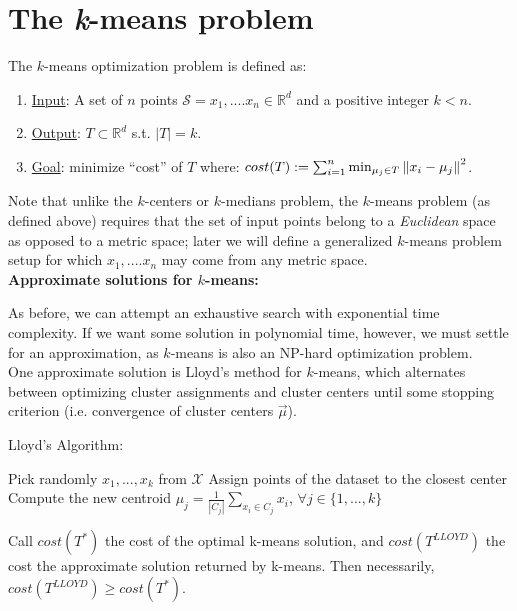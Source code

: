 \section{The \emph{k}-means problem}
The $k$-means optimization problem is defined as:
\begin{enumerate}
\item \underline{Input}: A set of $n$ points $\mathcal{S} = x_1,....x_n \in
\mathbb{R}^d$ and a positive integer $k<n$.
\item \underline{Output}: $T \subset  \mathbb{R}^d$ s.t. $|T|=k$. 
\item \underline{Goal}: minimize ``cost'' of $T$ where: $cost(T) 
:= \sum_{i = 1}^{n} \min_{\mu_j \in T} \left\lVert x_i-\mu_j\right\rVert^2 $.
\end{enumerate}

Note that unlike the $k$-centers or $k$-medians problem, the $k$-means problem (as defined above) requires that the set of input points belong to a \emph{Euclidean} space as opposed to a metric space; later we will define a generalized $k$-means problem setup for which $x_1,....x_n$ may come from any metric space. \\

\noindent\textbf{Approximate solutions for $k$-means:}  

As before, we can attempt an exhaustive search with exponential
time complexity. If we want some solution in polynomial time, however, we
must settle for an approximation, as $k$-means is also an NP-hard
optimization problem. \\

One approximate solution is Lloyd's method for $k$-means, which alternates between optimizing cluster assignments and cluster centers until some stopping criterion (i.e. convergence of cluster centers $\vec{\mu}$).

\begin{algorithm}
\caption{Lloyd's Algorithm:}
\begin{algorithmic} 
\STATE Pick randomly $x_1,...,x_k $ from $\mathcal{X}$ \;
\STATE Assign points of the dataset to the closest center \;
\STATE Compute the new centroid $\mu_j = \frac{1}{|C_j|}
\sum_{x_i\in C_j} x_i$, $\forall j \in \{1,...,k\}$\;
\ENDFOR
\ENDWHILE
\end{algorithmic}
\end{algorithm}

\begin{remark}
Call $cost(T^*)$ the cost of the optimal k-means solution, and $cost(T^{LLOYD})$ the cost the approximate solution returned by k-means. Then necessarily, $cost(T^{LLOYD}) \geq cost(T^*)$.
\end{remark}

